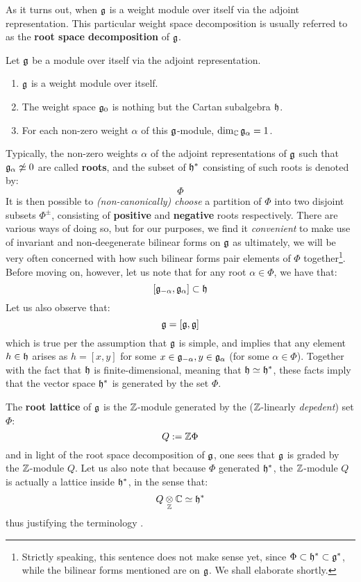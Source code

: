         As it turns out, when $\mathfrak{g}$ is a weight module over itself via the adjoint representation. This particular weight space decomposition is usually referred to as the \textbf{root space decomposition} of $\mathfrak{g}$. 
        \begin{theorem} \label{theorem: root_space_decomposition_for_finite_dimensional_simple_lie_algebras}
            Let $\mathfrak{g}$ be a module over itself via the adjoint representation.
            \begin{enumerate}
                \item $\mathfrak{g}$ is a weight module over itself.
                \item The weight space $\mathfrak{g}_0$ is nothing but the Cartan subalgebra $\mathfrak{h}$.
                \item For each non-zero weight $\alpha$ of this $\mathfrak{g}$-module, $\dim_{\mathbb{C}} \mathfrak{g}_{\alpha} = 1$.
            \end{enumerate}
        \end{theorem}
        Typically, the non-zero weights $\alpha$ of the adjoint representations of $\mathfrak{g}$ such that $\mathfrak{g}_{\alpha} \not \simeq 0$ are called \textbf{roots}, and the subset of $\mathfrak{h}^*$ consisting of such roots is denoted by:
            $$\Phi$$
        It is then possible to \textit{(non-canonically) choose} a partition of $\Phi$ into two disjoint subsets $\Phi^{\pm}$, consisting of \textbf{positive} and \textbf{negative} roots respectively. There are various ways of doing so, but for our purposes, we find it \textit{convenient} to make use of invariant and non-deegenerate bilinear forms on $\mathfrak{g}$ as ultimately, we will be very often concerned with how such bilinear forms pair elements of $\Phi$ together\footnote{Strictly speaking, this sentence does not make sense yet, since $\Phi \subset \mathfrak{h}^* \subset \mathfrak{g}^*$, while the bilinear forms mentioned are on $\mathfrak{g}$. We shall elaborate shortly.}. Before moving on, however, let us note that for any root $\alpha \in \Phi$, we have that:
            $$[\mathfrak{g}_{-\alpha}, \mathfrak{g}_{\alpha}] \subset \mathfrak{h}$$
        Let us also observe that:
            $$\mathfrak{g} = [\mathfrak{g}, \mathfrak{g}]$$
        which is true per the assumption that $\mathfrak{g}$ is simple, and implies that any element $h \in \mathfrak{h}$ arises as $h = [x, y]$ for some $x \in \mathfrak{g}_{-\alpha}, y \in \mathfrak{g}_{\alpha}$ (for some $\alpha \in \Phi$). Together with the fact that $\mathfrak{h}$ is finite-dimensional, meaning that $\mathfrak{h} \simeq \mathfrak{h}^*$, these facts imply that the vector space $\mathfrak{h}^*$ is generated by the set $\Phi$.

        The \textbf{root lattice} of $\mathfrak{g}$ is the $\mathbb{Z}$-module generated by the ($\mathbb{Z}$-linearly \textit{depedent}) set $\Phi$:
            $$Q := \mathbb{Z} \Phi$$
        and in light of the root space decomposition of $\mathfrak{g}$, one sees that $\mathfrak{g}$ is graded by the $\mathbb{Z}$-module $Q$. Let us also note that because $\Phi$ generated $\mathfrak{h}^*$, the $\mathbb{Z}$-module $Q$ is actually a lattice inside $\mathfrak{h}^*$, in the sense that:
            $$Q \tensor_{\Z} \bbC \cong \h^*$$
        thus justifying the terminology .

